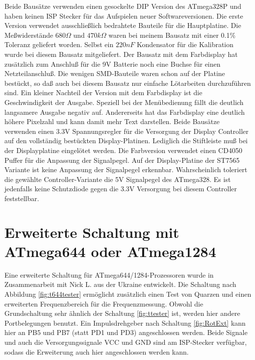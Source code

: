 Beide Bausätze verwenden einen gesockelte DIP Version des ATmega328P und haben keinen 
ISP Stecker für das Aufspielen neuer Softwareversionen.
Die erste Version verwendet
ausschließlich bedrahtete Bauteile für die Hauptplatine. Die Meßwiderstände \(680\Omega\) und \(470k\Omega\)
waren bei meinem Bausatz mit einer 0.1\% Toleranz geliefert worden.
Selbst ein \(220 nF\) Kondensator für die Kalibration wurde bei diesem Bausatz mitgeliefert.
Der Bausatz mit dem Farbdisplay hat zusätzlich zum Anschluß für die 9V Batterie noch eine Buchse
für einen Netzteilanschluß. Die wenigen SMD-Bauteile waren schon auf der Platine bestückt,
so daß auch bei diesem Bausatz nur einfache Lötarbeiten durchzuführen sind.
Ein kleiner Nachteil der Version mit dem Farbdisplay ist die Geschwindigkeit der Ausgabe.
Speziell bei der Menübedienung fällt die deutlich langsamere Ausgabe negativ auf.
Andererseits hat das Farbdisplay eine deutlich höhere Pixelzahl und kann damit mehr Text darstellen. 
Beide Bausätze verwenden einen 3.3V Spannungsregler für die Versorgung der Display Controller auf
den vollständig bestückten Display-Platinen. Lediglich die Stiftleiste muß bei
der Displayplatine eingelötet werden.
Die Farbversion verwendet einen CD4050 Puffer für die Anpassung der Signalpegel.
Auf der Display-Platine der ST7565 Variante ist keine Anpassung der Signalpegel erkennbar.
Wahrscheinlich toleriert die gewählte Controller-Variante die 5V Signalpegel des ATmega328.
Es ist jedenfalls keine Schutzdiode gegen die 3.3V Versorgung bei diesem Controller feststellbar.

\section{Erweiterte Schaltung mit ATmega644 oder ATmega1284}

Eine erweiterte Schaltung für ATmega644/1284-Prozessoren wurde in Zusammenarbeit mit Nick L. aus
der Ukraine entwickelt. Die Schaltung nach Abbildung \ref{fig:t644tester} ermöglicht zusätzlich
einen Test von Quarzen und einen erweiterten Frequenzbereich für die Frequenzmessung.
Obwohl die Grundschaltung sehr ähnlich der Schaltung \ref{fig:ttester} ist, werden hier
andere Portbelegungen benutzt.
Ein Impulsdrehgeber nach Schaltung \ref{fig:RotExt} kann hier an PB5 und PB7 (statt PD1 und PD3) angeschlossen werden.
Beide Signale und auch die Versorgungssignale VCC und GND sind am ISP-Stecker verfügbar,
sodass die Erweiterung auch hier angeschlossen werden kann.\\

